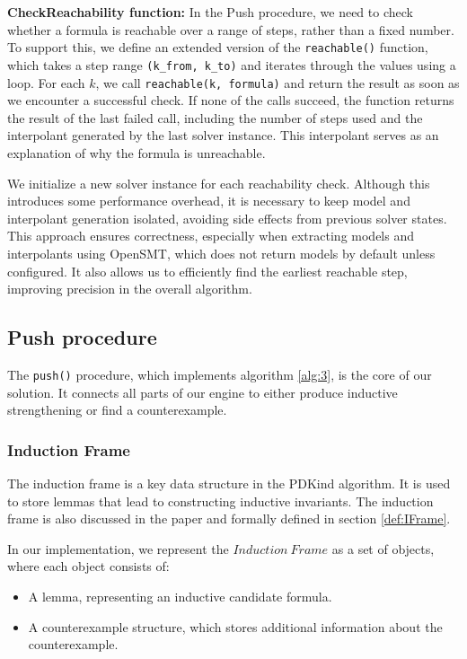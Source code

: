 \textbf{CheckReachability function:}
\noindent In the Push procedure, we need to check whether a formula is
reachable over a range of steps, rather than a fixed number. To support this,
we define an extended version of the \texttt{reachable()} function, which takes
a step range \texttt{(k\_from, k\_to)} and iterates through the values using a
loop. For each \( k \), we call \texttt{reachable(k, formula)} and return the
result as soon as we encounter a successful check. If none of the calls
succeed, the function returns the result of the last failed call, including the
number of steps used and the interpolant generated by the last solver instance.
This interpolant serves as an explanation of why the formula is unreachable.

We initialize a new solver instance for each reachability check. Although this
introduces some performance overhead, it is necessary to keep model and
interpolant generation isolated, avoiding side effects from previous solver
states. This approach ensures correctness, especially when extracting models
and interpolants using OpenSMT, which does not return models by default unless
configured. It also allows us to efficiently find the earliest reachable step,
improving precision in the overall algorithm.

\subsection{Push procedure}

\noindent The \texttt{push()} procedure, which implements
algorithm \ref{alg:3}, is the core of our solution. It
connects all parts of our engine to either produce inductive strengthening or
find a counterexample.

\subsubsection{Induction Frame}

\noindent The induction frame is a key data structure in the PDKind algorithm.
It is used to store lemmas that lead to constructing inductive invariants. The
induction frame is also discussed in the paper \cite{7886665} and formally
defined in section \ref{def:IFrame}.

In our implementation, we represent the \( Induction\ Frame \) as a set of objects, where each object consists of:
\begin{itemize}
    \item A lemma, representing an inductive candidate formula.
    \item A counterexample structure, which stores additional information about the counterexample.
\end{itemize}

